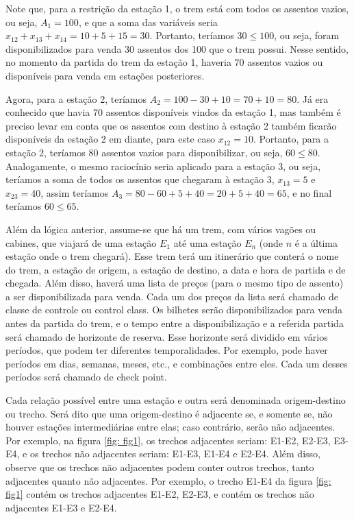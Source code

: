 Note que, para a restrição da estação 1, o trem está com todos os assentos vazios, ou seja, \(A_1=100\), e que a soma das variáveis seria \(x_{12} + x_{13} + x_{14} = 10 + 5 + 15 = 30\). Portanto, teríamos \(30 \leq 100\), ou seja, foram disponibilizados para venda 30 assentos dos 100 que o trem possui. Nesse sentido, no momento da partida do trem da estação 1, haveria 70 assentos vazios ou disponíveis para venda em estações posteriores.

Agora, para a estação 2, teríamos \(A_2 = 100 - 30 + 10 = 70 + 10 = 80\). Já era conhecido que havia 70 assentos disponíveis vindos da estação 1, mas também é preciso levar em conta que os assentos com destino à estação 2 também ficarão disponíveis da estação 2 em diante, para este caso \(x_{12} = 10\). Portanto, para a estação 2, teríamos 80 assentos vazios para disponibilizar, ou seja, \(60 \leq 80\). Analogamente, o mesmo raciocínio seria aplicado para a estação 3, ou seja, teríamos a soma de todos os assentos que chegaram à estação 3, \(x_{13} = 5\) e \(x_{23} = 40\), assim teríamos \(A_3 = 80 - 60 + 5 + 40 = 20 + 5 + 40 = 65\), e no final teríamos \(60 \leq 65\).

Além da lógica anterior, assume-se que há um trem, com vários vagões ou cabines, que viajará de uma estação $E_1$ até uma estação $E_n$ (onde $n$ é a última estação onde o trem chegará). Esse trem terá um itinerário que conterá o nome do trem, a estação de origem, a estação de destino, a data e hora de partida e de chegada. Além disso, haverá uma lista de preços (para o mesmo tipo de assento) a ser disponibilizada para venda. Cada um dos preços da lista será chamado de classe de controle ou control class. Os bilhetes serão disponibilizados para venda antes da partida do trem, e o tempo entre a disponibilização e a referida partida será chamado de horizonte de reserva. Esse horizonte será dividido em vários períodos, que podem ter diferentes temporalidades. Por exemplo, pode haver períodos em dias, semanas, meses, etc., e combinações entre eles. Cada um desses períodos será chamado de check point.

Cada relação possível entre uma estação e outra será denominada origem-destino ou trecho. Será dito que uma origem-destino é adjacente se, e somente se, não houver estações intermediárias entre elas; caso contrário, serão não adjacentes. Por exemplo, na figura \ref{fig: fig1}, os trechos adjacentes seriam: E1-E2, E2-E3, E3-E4, e os trechos não adjacentes seriam: E1-E3, E1-E4 e E2-E4. Além disso, observe que os trechos não adjacentes podem conter outros trechos, tanto adjacentes quanto não adjacentes. Por exemplo, o trecho E1-E4 da figura \ref{fig: fig1} contém os trechos adjacentes E1-E2, E2-E3, e contém os trechos não adjacentes E1-E3 e E2-E4.

